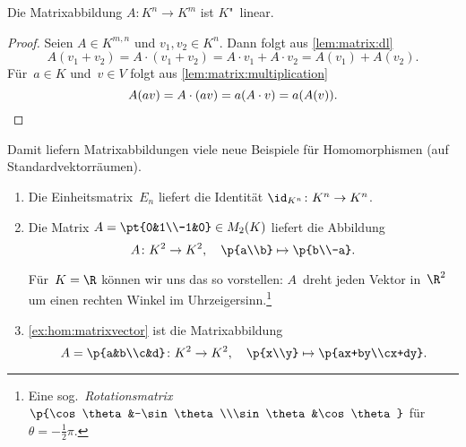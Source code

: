 \documentclass[a4paper]{article}
\begin{document}
\begin{lemma}\label{lem:matrixtransformation}
    Die Matrixabbildung $A\colon K^n \to K^m$ ist $K$"~linear.
\end{lemma}

\begin{proof}
    Seien $A \in K^{m,n}$ und $v_1,v_2 \in K^n$. Dann folgt aus \cref{lem:matrix:dl}
    \begin{equation*}
        A(v_1+v_2) = A \cdot (v_1+v_2) = A\cdot v_1 + A\cdot v_2 = A(v_1)+A(v_2).
    \end{equation*}
    Für~$a \in K$ und~$v \in V$ folgt aus \cref{lem:matrix:multiplication}
    \begin{equation*}
        A(av) = A \cdot (av) = a(A\cdot v) = a(A(v)). \qedhere
    \end{equation*}
\end{proof}

Damit liefern Matrixabbildungen viele neue Beispiele für Homomorphismen (auf Standardvektorräumen).

\begin{example}\leavevmode
    \begin{enumerate}
        \item Die Einheitsmatrix~$E_n$ liefert die Identität $\id_{K^n}\colon K^n \to K^n$.
        \item Die Matrix $A = \pt{0&1\\-1&0} \in M_2(K)$ liefert die Abbildung
        \begin{equation*}
            A\colon K^2 \to K^2,\quad \p{a\\b} \mapsto \p{b\\-a}.
        \end{equation*}

        Für~$K = \R$ können wir uns das so vorstellen: $A$~dreht jeden Vektor in~$\R^2$ um einen rechten Winkel im Uhrzeigersinn.\footnote{Eine sog.\ \emph{Rotationsmatrix} $\p{\cos\theta&-\sin\theta\\\sin\theta&\cos\theta}$ für~$\theta = -\frac{1}{2}\pi$.}
        \item \cref{ex:hom:matrixvector} ist die Matrixabbildung
        \begin{equation*}
            A = \p{a&b\\c&d}\colon K^2 \to K^2,\quad \p{x\\y} \mapsto \p{ax+by\\cx+dy}.
        \end{equation*}
    \end{enumerate}
\end{example}
\end{document}
